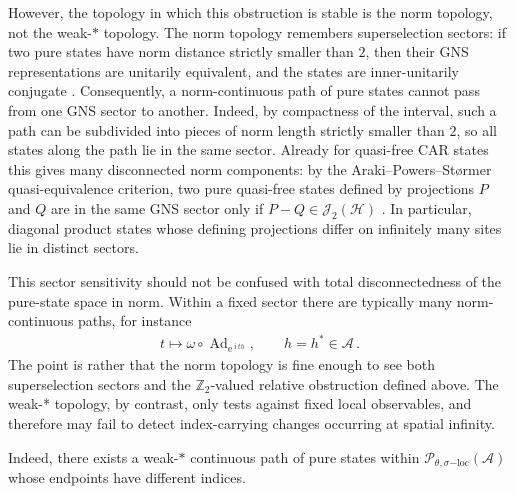 \documentclass[a4paper,10pt]{article}
\numberwithin{equation}{section}
\theoremstyle{plain}
\theoremstyle{plain}
\theoremstyle{plain}
\theoremstyle{plain}
\theoremstyle{plain}
\theoremstyle{remark}
\theoremstyle{definition}
\newcommand{\ee}{\operatorname{e}}
\newcommand{\ii}{\operatorname{i}}
\newcommand{\ZZ}{\mathbb{Z}}
\newcommand{\calA}{\mathcal{A}}
\newcommand{\calH}{\mathcal{H}}
\newcommand{\calJ}{\mathcal{J}}
\newcommand{\calP}{\mathcal{P}}
\newcommand{\Ad}[1]{\operatorname{Ad}_{#1}}
\newcommand{\eq}[1]{\begin{align*}#1\end{align*}}
\begin{document}
However, the topology in which this obstruction is stable is the norm topology, not the weak-$*$ topology. The norm topology remembers superselection sectors: if two pure states have norm distance strictly smaller than $2$, then their GNS representations are unitarily equivalent, and the states are inner-unitarily conjugate \cite[Corollaries~8--9]{GlimmKadison1960}. Consequently, a norm-continuous path of pure states cannot pass from one GNS sector to another. Indeed, by compactness of the interval, such a path can be subdivided into pieces of norm length strictly smaller than $2$, so all states along the path lie in the same sector. Already for quasi-free CAR states this gives many disconnected norm components: by the Araki--Powers--St{\o}rmer quasi-equivalence criterion, two pure quasi-free states defined by projections $P$ and $Q$ are in the same GNS sector only if $P-Q\in\calJ_2(\calH)$ \cite{Araki1970QuasifreeCAR,PowersStormer1970FreeStates}. In particular, diagonal product states whose defining projections differ on infinitely many sites lie in distinct sectors.

This sector sensitivity should not be confused with total disconnectedness of the pure-state space in norm. Within a fixed sector there are typically many norm-continuous paths, for instance
\eq{
t\longmapsto \omega\circ\Ad{\ee^{\ii t h}},
\qquad h=h^\ast\in\calA\,.
}
The point is rather that the norm topology is fine enough to see both superselection sectors and the $\ZZ_2$-valued relative obstruction defined above. The weak-* topology, by contrast, only tests against fixed local observables, and therefore may fail to detect index-carrying changes occurring at spatial infinity. 

Indeed, there exists a weak-$*$ continuous path of pure states within
$\calP_{\theta,\sigma\mathrm{-loc}}(\calA)$ whose endpoints have different
indices.
\end{document}
